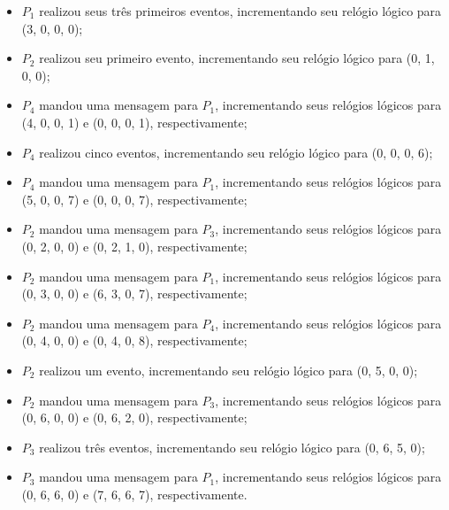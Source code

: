 \documentclass[conference]{IEEEtran}
\begin{document}
\begin{itemize}
\item $P_1$ realizou seus três primeiros eventos, incrementando seu relógio lógico para (3, 0, 0, 0);
\item $P_2$ realizou seu primeiro evento, incrementando seu relógio lógico para (0, 1, 0, 0);
\item $P_4$ mandou uma mensagem para $P_1$, incrementando seus relógios lógicos para (4, 0, 0, 1) e (0, 0, 0, 1), respectivamente;
\item $P_4$ realizou cinco eventos, incrementando seu relógio lógico para (0, 0, 0, 6);
\item $P_4$ mandou uma mensagem para $P_1$, incrementando seus relógios lógicos para (5, 0, 0, 7) e (0, 0, 0, 7), respectivamente;
\item $P_2$ mandou uma mensagem para $P_3$, incrementando seus relógios lógicos para (0, 2, 0, 0) e (0, 2, 1, 0), respectivamente;
\item $P_2$ mandou uma mensagem para $P_1$, incrementando seus relógios lógicos para (0, 3, 0, 0) e (6, 3, 0, 7), respectivamente;
\item $P_2$ mandou uma mensagem para $P_4$, incrementando seus relógios lógicos para (0, 4, 0, 0) e (0, 4, 0, 8), respectivamente;
\item $P_2$ realizou um evento, incrementando seu relógio lógico para (0, 5, 0, 0);
\item $P_2$ mandou uma mensagem para $P_3$, incrementando seus relógios lógicos para (0, 6, 0, 0) e (0, 6, 2, 0), respectivamente;
\item $P_3$ realizou três eventos, incrementando seu relógio lógico para (0, 6, 5, 0);
\item $P_3$ mandou uma mensagem para $P_1$, incrementando seus relógios lógicos para (0, 6, 6, 0) e (7, 6, 6, 7), respectivamente.
\end{itemize}


\end{document}
